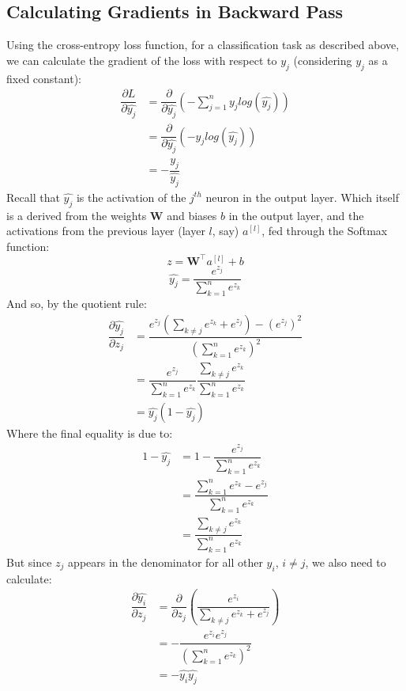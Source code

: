 \documentclass[11pt]{article} %
\theoremstyle{plain}
\theoremstyle{definition}
\begin{document}
\subsection{Calculating Gradients in Backward Pass} \label{Backward-Pass}
Using the cross-entropy loss function, for a classification task as described above, we can calculate the gradient of the loss with respect to $\hat{y_j}$ (considering \(y_j\) as a fixed constant):
\begin{align*}
\dfrac{\partial  L}{\partial \hat{y_j}} &= \dfrac{\partial }{\partial \hat{y_j}}(- \sum_{j=1}^n y_jlog(\hat{y_j})) \\
&= \dfrac{\partial }{\partial \hat{y_j}}(-y_jlog(\hat{y_j})) \\
&= -\dfrac{y_j}{\hat{y_j}}
\end{align*}
Recall that $\hat{y_j}$ is the activation of the \(j^{th}\) neuron in the output layer. Which itself is a derived from the weights \(\mathbf{W}\) and biases \(b\) in the output layer, and the activations from the previous layer (layer \(l\), say) \(a^{[l]}\), fed through the Softmax function:
\[ z = \mathbf{W^{\top}}a^{[l]} + b\]   
\[ \hat{y_j} = \dfrac{e^{z_j}}{\sum_{k=1}^n e^{z_k}} \]
And so, by the quotient rule:
\begin{align*}
\dfrac{\partial  \hat{y_j}}{\partial z_j} &= \dfrac{e^{z_j}(\sum_{k \neq j}e^{z_k}+e^{z_j}) - (e^{z_j})^2}{(\sum_{k=1}^n e^{z_k})^2} \\
&= \dfrac{e^{z_j}}{\sum_{k=1}^n e^{z_k}} \dfrac{\sum_{k \neq j}e^{z_k}}{\sum_{k=1}^n e^{z_k}} \\
&= \hat{y_j}(1-\hat{y_j})
\end{align*}
Where the final equality is due to:
\begin{align*}
1-\hat{y_j} &= 1 - \dfrac{e^{z_j}}{\sum_{k=1}^n e^{z_k}} \\
&= \dfrac {\sum_{k=1}^n e^{z_k} - e^{z_j}}{\sum_{k=1}^n e^{z_k}} \\
&= \dfrac {\sum_{k \neq j} e^{z_k}}{\sum_{k=1}^n e^{z_k}}
\end{align*}
But since \(z_j\) appears in the denominator for all other \(y_i\), \(i \neq j\), we also need to calculate:
\begin{align*}
\dfrac{\partial \hat{y_i}}{\partial z_j} &= \dfrac{\partial }{\partial z_j} (\dfrac{e^{z_i}}{\sum_{k \neq j} e^{z_k} + e^{z_j}})  \\
&= -\dfrac{e^{z_i}e^{z_j}}{(\sum_{k=1}^n e^{z_k})^2} \\
&= -\hat{y_i}\hat{y_j}
\end{align*}
\end{document}
